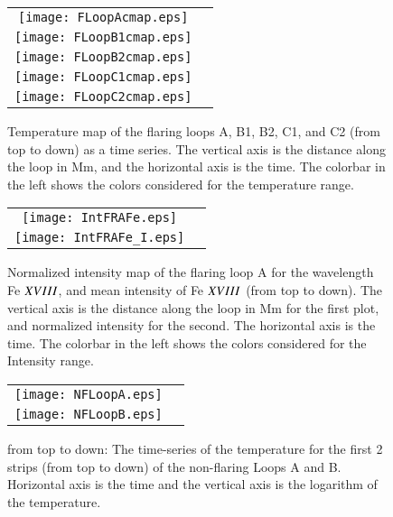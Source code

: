 \documentclass[oneside,onecolumn]{article}
\begin{document}
\begin{figure}[htp]

  \centering

    \begin{tabular}{cc}
    
    \texttt{[image: FLoopAcmap.eps]}\\
    \texttt{[image: FLoopB1cmap.eps]}\\
    \texttt{[image: FLoopB2cmap.eps]}\\
    \texttt{[image: FLoopC1cmap.eps]}\\
    \texttt{[image: FLoopC2cmap.eps]}\\
  \end{tabular}
\caption{Temperature map of the flaring loops A, B1, B2, C1, and C2 (from top to down) as a time series. The vertical axis is the distance along the loop in Mm, and the horizontal axis is the time. The colorbar in the left shows the colors considered for the temperature range. }
\label{fig4}
\end{figure}

\begin{figure}[htp]
\centering
\begin{tabular}{cc} 
\texttt{[image: IntFRAFe.eps]}\\
\texttt{[image: IntFRAFe\_I.eps]}\\
\end{tabular}
\caption{Normalized intensity map of the flaring loop A for the wavelength Fe $\footnotesize{XVIII}$, and mean intensity of Fe $\footnotesize{XVIII}$ (from top to down). The vertical axis is the distance along the loop in Mm for the first plot, and normalized intensity for the second. The horizontal axis is the time. The colorbar in the left shows the colors considered for the Intensity range.
}
\label{figIntF}
\end{figure}
\begin{figure}[htp]

  \centering

    \begin{tabular}{cc}
    
    \texttt{[image: NFLoopA.eps]}\\
    \texttt{[image: NFLoopB.eps]}\\
  \end{tabular}
\caption{from top to down: The time-series of the temperature for the first 2 strips (from top to down) of the non-flaring Loops A and B. Horizontal axis is the time and the vertical axis is the logarithm of the temperature.}
\label{fig5}
\end{figure}
\end{document}
